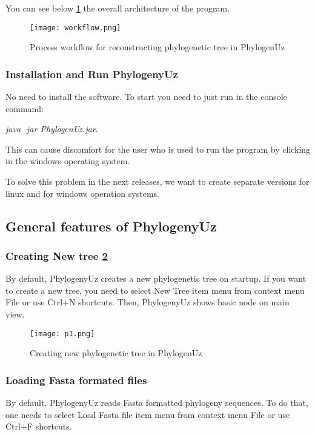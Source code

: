 You can see below \ref{img:workflow1} the overall architecture of the program.

\begin{figure}[!htbp] 
  \center
  \texttt{[image: workflow.png]}
  \caption[w]{Process workflow for reconstructing 
  phylogenetic tree in PhylogenUz} 
  \label{img:workflow1}  
\end{figure}

\subsubsection{Installation and Run PhylogenyUz}
No need to install the software. To start you 
need to just run in the console command:

\textit{java -jar PhylogenUz.jar}.

This can cause discomfort for the user who is used to run 
the program by clicking in the windows operating system.

To solve this problem in the next releases, we want 
to create separate versions for linux and for 
windows operation systems.

\subsection{General features of PhylogenyUz}

\subsubsection{Creating New tree \ref{img:p1}}
By default, PhylogenyUz creates a new phylogenetic tree on startup.
If you want to create a new tree, you need to select New Tree item menu from 
context menu File or use Ctrl+N shortcuts.
Then, PhylogenyUz shows basic node on main view.

\begin{figure}[!htbp] 
  \center
  \texttt{[image: p1.png]}
  \caption[w]{Creating new phylogenetic tree in PhylogenUz} 
  \label{img:p1}  
\end{figure}

\subsubsection{Loading Fasta formated files}
By default, PhylogenyUz reads Fasta \cite{fasta} formatted 
phylogeny sequences. To do that, one needs to select Load Fasta 
file item menu from context menu File or use Ctrl+F shortcuts.

